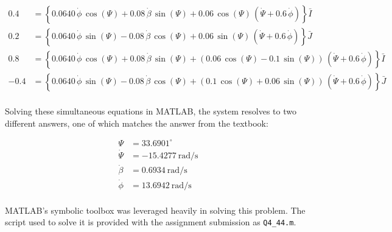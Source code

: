 \documentclass[12pt, letterpaper]{../assignment}
\begin{document}
\begin{equation*}
    \begin{aligned}
        0.4 &= \left\{0.0640\,\dot{\phi }\,\cos\left(\Psi\right)+0.08\,\dot{\beta }\,\sin\left(\Psi\right)+0.06\,\cos\left(\Psi\right)\,\left(\dot{\Psi }+0.6\,\dot{\phi }\right)\right\}\bar{I}\\
        0.2 &= \left\{0.0640\,\dot{\phi }\,\sin\left(\Psi\right)-0.08\,\dot{\beta }\,\cos\left(\Psi\right)+0.06\,\sin\left(\Psi\right)\,\left(\dot{\Psi }+0.6\,\dot{\phi }\right)\right\}\bar{J}\\
        0.8 &= \left\{0.0640\,\dot{\phi }\,\cos\left(\Psi\right)+0.08\,\dot{\beta }\,\sin\left(\Psi\right)+\left(0.06\,\cos\left(\Psi\right)-0.1\,\sin\left(\Psi\right)\right)\,\left(\dot{\Psi }+0.6\,\dot{\phi }\right)\right\}\bar{I}\\
       -0.4 &= \left\{0.0640\,\dot{\phi }\,\sin\left(\Psi\right)-0.08\,\dot{\beta }\,\cos\left(\Psi\right)+\left(0.1\,\cos\left(\Psi\right)+0.06\,\sin\left(\Psi\right)\right)\,\left(\dot{\Psi }+0.6\,\dot{\phi }\right)\right\}\bar{J}\\
    \end{aligned}
\end{equation*}

Solving these simultaneous equations in MATLAB,
the system resolves to two different answers,
one of which matches the answer from the textbook:

\begin{answer}
\begin{equation*}
    \begin{aligned}
        \Psi &= 33.6901^\circ \\
        \dot{\Psi} &= -15.4277 \ \text{rad/s}\\
        \dot{\beta} &= 0.6934 \ \text{rad/s}\\
        \dot{\phi} &= 13.6942 \ \text{rad/s}\\
    \end{aligned}
\end{equation*}
\end{answer}

MATLAB's symbolic toolbox was leveraged heavily in solving this problem.
The script used to solve it is provided with the assignment submission as \texttt{Q4\_44.m}.




\end{document}
